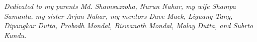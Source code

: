 \vspace{-2.5in}
\emph{
Dedicated to my parents Md. Shamsuzzoha, Nurun Nahar, my wife Shampa Samanta, my sister Arjun Nahar, my mentors Dave Mack, Liguang Tang, Dipangkar Dutta, Probodh Mondal, Biswanath Mondal, Malay Dutta, and Subrto Kundu.
}
